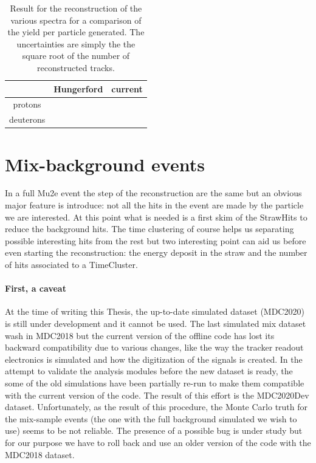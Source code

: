 \documentclass[12pt,a4paper,openright, oneside, titlepage]{book} %
\begin{document}
\begin{table}
\centering
\begin{tabular}{|c|c|c|}
\hline
 & Hungerford & current \\
\hline
\hline
protons & & \\
\hline
deuterons & & \\
\hline
\end{tabular}
\caption{Result for the reconstruction of the various spectra for a comparison of the yield per particle generated. The uncertainties are simply the the square root of the number of reconstructed tracks.}
\label{T_syst}
\end{table}

\section{Mix-background events}
In a full Mu2e event the step of the reconstruction are the same but an obvious major feature is introduce: not all the hits in the event are made by the particle we are interested.
At this point what is needed is a first skim of the StrawHits to reduce the background hits.
The time clustering of course helps us separating possible interesting hits from the rest but two interesting point can aid us before even starting the reconstruction: the energy deposit in the straw and the number of hits associated to a TimeCluster.

\paragraph{First, a caveat} At the time of writing this Thesis, the up-to-date simulated dataset (MDC2020) is still under development and it cannot be used. 
The last simulated mix dataset wash in MDC2018 but the current version of the offline code has lost its backward compatibility due to various changes, like the way the tracker readout electronics is simulated and how the digitization of the signals  is created. 
In the attempt to validate the analysis modules before the new dataset is ready, the some of the old simulations have been partially re-run to make them compatible with the current version of the code. 
The result of this effort is the MDC2020Dev dataset.
Unfortunately, as the result of this procedure, the Monte Carlo truth for the mix-sample events (the one with the full background simulated we wish to use) seems to be not reliable. 
The presence of a possible bug is under study but for our purpose we have to roll back and use an older version of the code with the MDC2018 dataset.
\end{document}
